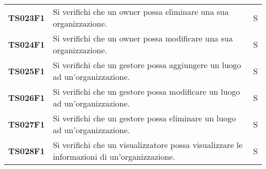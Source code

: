 \documentclass[../../piano-di-qualifica.tex]{subfiles}
\begin{document}
\begin{longtable}[H]{>{\centering\bfseries}m{3cm} >{}m{10cm} >{\centering\arraybackslash}m{3cm}}
  TS023F1            & Si verifichi che un owner possa eliminare una sua organizzazione.
                     & S                                                                                                                                                                                                                                                   \\

  TS024F1            & Si verifichi che un owner possa modificare una sua organizzazione.
                     & S                                                                                                                                                                                                                                                   \\

  TS025F1            & Si verifichi che un gestore possa aggiungere un luogo ad un'organizzazione.
                     & S                                                                                                                                                                                                                                                   \\

  TS026F1            & Si verifichi che un gestore possa modificare un luogo ad un'organizzazione.
                     & S                                                                                                                                                                                                                                                   \\

  TS027F1            & Si verifichi che un gestore possa eliminare un luogo ad un'organizzazione.
                     & S                                                                                                                                                                                                                                                   \\

  TS028F1            & Si verifichi che un visualizzatore possa visualizzare le informazioni di un'organizzazione.
                     & S                                                                                                                                                                                                                                                   \\


\end{longtable}
\end{document}
